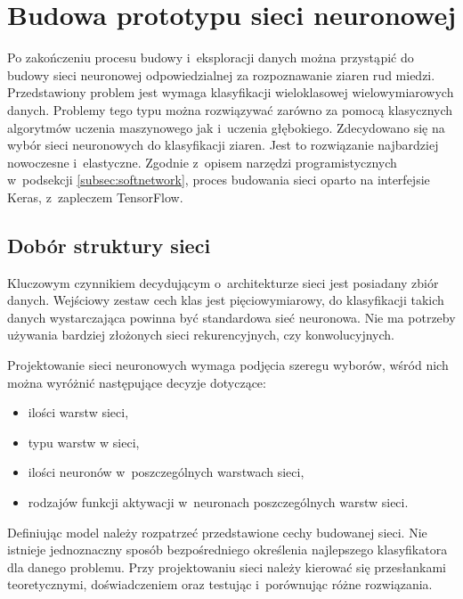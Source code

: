 \section{Budowa prototypu sieci neuronowej}
Po zakończeniu procesu budowy i~eksploracji danych można przystąpić do
budowy sieci neuronowej odpowiedzialnej za rozpoznawanie ziaren rud miedzi.
Przedstawiony problem jest wymaga klasyfikacji wieloklasowej wielowymiarowych
danych.
Problemy tego typu można rozwiązywać zarówno za pomocą klasycznych algorytmów
uczenia maszynowego jak i~uczenia głębokiego.
Zdecydowano się na wybór sieci neuronowych do klasyfikacji ziaren.
Jest to rozwiązanie najbardziej nowoczesne i~elastyczne.
Zgodnie z~opisem narzędzi programistycznych w~podsekcji
\ref{subsec:softnetwork}, proces budowania sieci oparto na interfejsie Keras,
z~zapleczem TensorFlow.

\subsection{Dobór struktury sieci} \label{subsec:nnbuild}
Kluczowym czynnikiem decydującym o~architekturze sieci jest posiadany
zbiór danych.
Wejściowy zestaw cech klas jest pięciowymiarowy, do klasyfikacji takich
danych wystarczająca powinna być standardowa sieć neuronowa.
Nie ma potrzeby używania bardziej złożonych sieci rekurencyjnych, czy
konwolucyjnych.

Projektowanie sieci neuronowych wymaga podjęcia szeregu wyborów, wśród nich
można wyróżnić następujące decyzje dotyczące:
\begin{itemize}
	\item ilości warstw sieci,
	\item typu warstw w sieci,
	\item ilości neuronów w~poszczególnych warstwach sieci,
	\item rodzajów funkcji aktywacji w~neuronach poszczególnych warstw sieci.
\end{itemize}
Definiując model należy rozpatrzeć przedstawione cechy budowanej sieci.
Nie istnieje jednoznaczny sposób bezpośredniego określenia najlepszego
klasyfikatora dla danego problemu.
Przy projektowaniu sieci należy kierować się przesłankami teoretycznymi,
doświadczeniem oraz testując i~porównując różne rozwiązania.

